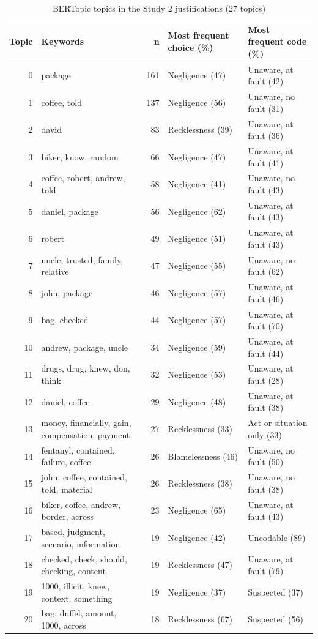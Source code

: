 \begin{table}[H]
\centering
\caption{BERTopic topics in the Study 2 justifications (27 topics)}
\label{tab:topics_s2}
\footnotesize
\begin{tabular}{rp{4.4cm}rll}
\toprule
Topic & Keywords & n & Most frequent choice (\%) & Most frequent code (\%) \\
\midrule
0 & \raggedright package & 161 & Negligence (47) & Unaware, at fault (42) \tabularnewline
1 & \raggedright coffee, told & 137 & Negligence (56) & Unaware, no fault (31) \tabularnewline
2 & \raggedright david & 83 & Recklessness (39) & Unaware, at fault (36) \tabularnewline
3 & \raggedright biker, know, random & 66 & Negligence (47) & Unaware, at fault (41) \tabularnewline
4 & \raggedright coffee, robert, andrew, told & 58 & Negligence (41) & Unaware, no fault (43) \tabularnewline
5 & \raggedright daniel, package & 56 & Negligence (62) & Unaware, at fault (43) \tabularnewline
6 & \raggedright robert & 49 & Negligence (51) & Unaware, at fault (43) \tabularnewline
7 & \raggedright uncle, trusted, family, relative & 47 & Negligence (55) & Unaware, no fault (62) \tabularnewline
8 & \raggedright john, package & 46 & Negligence (57) & Unaware, at fault (46) \tabularnewline
9 & \raggedright bag, checked & 44 & Negligence (57) & Unaware, at fault (70) \tabularnewline
10 & \raggedright andrew, package, uncle & 34 & Negligence (59) & Unaware, at fault (44) \tabularnewline
11 & \raggedright drugs, drug, knew, don, think & 32 & Negligence (53) & Unaware, at fault (28) \tabularnewline
12 & \raggedright daniel, coffee & 29 & Negligence (48) & Unaware, at fault (38) \tabularnewline
13 & \raggedright money, financially, gain, compensation, payment & 27 & Recklessness (33) & Act or situation only (33) \tabularnewline
14 & \raggedright fentanyl, contained, failure, coffee & 26 & Blamelessness (46) & Unaware, no fault (50) \tabularnewline
15 & \raggedright john, coffee, contained, told, material & 26 & Recklessness (38) & Unaware, no fault (38) \tabularnewline
16 & \raggedright biker, coffee, andrew, border, across & 23 & Negligence (65) & Unaware, at fault (43) \tabularnewline
17 & \raggedright based, judgment, scenario, information & 19 & Negligence (42) & Uncodable (89) \tabularnewline
18 & \raggedright checked, check, should, checking, content & 19 & Recklessness (47) & Unaware, at fault (79) \tabularnewline
19 & \raggedright 1000, illicit, knew, context, something & 19 & Negligence (37) & Suspected (37) \tabularnewline
20 & \raggedright bag, duffel, amount, 1000, across & 18 & Recklessness (67) & Suspected (56) \tabularnewline

\end{tabular}
\end{table}
